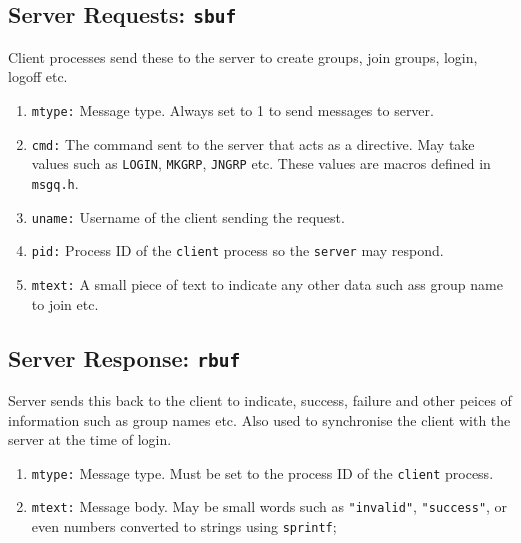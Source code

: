 \documentclass{article}
\begin{document}
\subsection{Server Requests: \lstinline{sbuf}}\label{sec:servreq}

Client processes send these to the server to create groups, join groups, login, logoff etc.
\begin{enumerate}
	\item \lstinline{mtype:} Message type. Always set to 1 to send messages to server.
	\item \lstinline{cmd:} The command sent to the server that acts as a directive. May take values such as \lstinline{LOGIN}, \lstinline{MKGRP}, \lstinline{JNGRP} etc. These values are macros defined in \lstinline{msgq.h}.
	\item \lstinline{uname:} Username of the client sending the request. 
	\item \lstinline{pid:} Process ID of the \lstinline{client} process so the \lstinline{server} may respond.
	\item \lstinline{mtext:} A small piece of text to indicate any other data such ass group name to join etc.
\end{enumerate}

\subsection{Server Response: \lstinline{rbuf}}

Server sends this back to the client to indicate, success, failure and other peices of information such as group names etc. Also used to synchronise the client with the server at the time of login.
\begin{enumerate}
	\item \lstinline{mtype:} Message type. Must be set to the process ID of the \lstinline{client} process.
	\item \lstinline{mtext:} Message body. May be small words such as \lstinline{"invalid"}, \lstinline{"success"}, or even numbers converted to strings using \lstinline{sprintf};
\end{enumerate}
\end{document}
